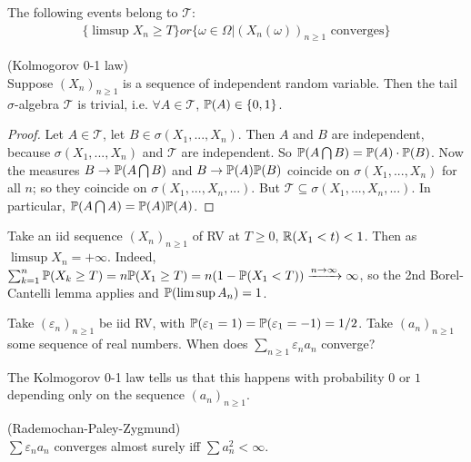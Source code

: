 \documentclass[a4paper]{article}
\begin{document}
\begin{eg}
The following events belong to $\mathcal{T}$:
\begin{equation*}
\begin{aligned}
\{\limsup X_n \geq T\} or \{\omega \in \Omega | (X_n(\omega))_{n \geq 1} \text{ converges}\}
\end{aligned}
\end{equation*}
\end{eg}

\begin{defi} (Kolmogorov 0-1 law)\\
Suppose $(X_n)_{n \geq 1}$ is a sequence of independent random variable. Then the tail $\sigma$-algebra $\mathcal{T}$ is trivial, i.e. $\forall A \in \mathcal{T}$, $\P(A) \in \{0,1\}$.
\begin{proof}
Let $A \in \mathcal{T}$, let $B \in \sigma(X_1,...,X_n)$. Then $A$ and $B$ are independent, because $\sigma(X_1,...,X_n)$ and $\mathcal{T}$ are independent. So $\P(A \bigcap B) = \P(A) \cdot \P(B)$. Now the measures $B \to \P(A \bigcap B)$ and $B \to \P(A) \P(B)$ coincide on $\sigma(X_1,...,X_n)$ for all $n$; so they coincide on $\sigma(X_1,...,X_n,...)$. But $\mathcal{T} \subseteq \sigma(X_1,...,X_n,...)$. In particular, $\P(A \bigcap A) = \P(A) \P(A)$.
\end{proof}
\end{defi}

\begin{eg}
Take an iid sequence $(X_n)_{n \geq 1}$ of RV at $T \geq 0$, $\R(X_1<t) < 1$. Then as $\limsup X_n = +\infty$. Indeed, $\sum_{k=1}^n \P(X_k \geq T) = n \P(X_1 \geq T) = n(1-\P(X_1<T)) \xrightarrow{n \to \infty} \infty$, so the 2nd Borel-Cantelli lemma applies and $\P(\limsup A_n) = 1$.
\end{eg}

\begin{eg}
Take $(\varepsilon_n)_{n \geq 1}$ be iid RV, with $\P(\varepsilon_1 = 1) = \P(\varepsilon_1 = -1) = 1/2$. Take $(a_n)_{n \geq 1}$ some sequence of real numbers. When does $\sum_{n \geq 1} \varepsilon_n a_n$ converge?

The Kolmogorov 0-1 law tells us that this happens with probability $0$ or $1$ depending only on the sequence $(a_n)_{n \geq 1}$.
\end{eg}

\begin{thm} (Rademochan-Paley-Zygmund)\\
$\sum \varepsilon_n a_n$ converges almost surely iff $\sum a_n^2 <\infty$.
\end{thm}
\end{document}

